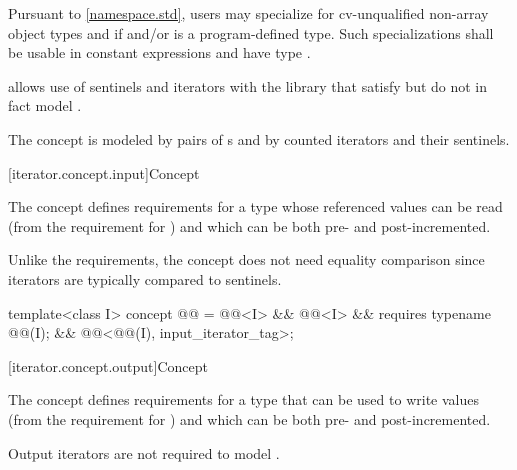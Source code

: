 \begin{itemdescr}
\pnum
\remarks
Pursuant to \ref{namespace.std},
users may specialize 
for cv-unqualified non-array object types  and 
if  and/or  is a program-defined type.
Such specializations shall
be usable in constant expressions and
have type .

\pnum
\begin{note}
 allows use of sentinels and iterators with
the library that satisfy but do not in fact model .
\end{note}

\pnum
\begin{example}
The  concept is modeled by pairs of
s and by
counted iterators and their sentinels.
\end{example}
\end{itemdescr}

[iterator.concept.input]{Concept }

\pnum
The  concept defines requirements for a type
whose referenced values can be read (from the requirement for
)
and which can be both pre- and post-incremented.
\begin{note}
Unlike the  requirements,
the  concept does not need
equality comparison since iterators are typically compared to sentinels.
\end{note}

\begin{codeblock}
template<class I>
  concept @@ =
    @@<I> &&
    @@<I> &&
    requires { typename @@(I); } &&
    @@<@@(I), input_iterator_tag>;
\end{codeblock}

[iterator.concept.output]{Concept }

\pnum
The  concept defines requirements for a type that
can be used to write values (from the requirement for
)
and which can be both pre- and post-incremented.
\begin{note}
Output iterators are not required to model .
\end{note}

